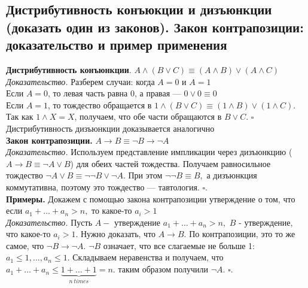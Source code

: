 \documentclass[a4paper]{article}
\newcommand{\qed}{\hfill$\square$}
\begin{document}
\subsection{Дистрибутивность конъюкции и дизъюнкции (доказать один из законов). Закон контрапозиции: доказательство и пример применения}
\label{sec:2.1}\textbf{Дистрибутивность конъюнкции}. $A\wedge(B\vee C)\equiv(A\wedge B)\vee(A\wedge C)$\\[2mm]
\textit{Доказательство.} Разберем случаи: когда $A=0$ и $A=1$\\[2mm]
\indent Если $A=0$, то левая часть равна 0, а правая — $0\vee0\equiv0$\\[2mm]
\indent Если $A=1$, то тождество обращается в $1\wedge(B\vee C)\equiv(1\wedge B)\vee(1\wedge C)$. Так как  $1\wedge X=X$, получаем, что обе части обращаются в $B\vee C$. \qed\\[2mm]
Дистрибутивность дизъюнкции доказывается аналогично\\[2mm]
\textbf{Закон контрапозиции.} $A\rightarrow B\equiv\neg B\rightarrow\neg A$\\[2mm]
\textit{Доказательство.} Используем представление импликации через
дизъюнкцию ($A\rightarrow B\equiv\neg A\vee B$) для обеих частей тождества. Получаем равносильное тождество $\neg A\vee B\equiv\neg\neg B\vee\neg A.$ При этом $\neg\neg B\equiv B,$ а дизъюнкция коммутативна, поэтому это тождество — тавтология. \qed.\\[2mm]
\textbf{Примеры.} Докажем с помощью закона контрапозиции утверждение о том, что если $a_1+\ldots+a_n>n,$ то какое-то $a_i>1$\\[2mm]
\textit{Доказательство.} Пусть $A-$ утверждение $a_1+\ldots+a_n>n,$ $B$ - утверждение, что какое-то $a_i>1$. Нужно доказать, что $A\rightarrow B$. По контрапозиции, это то же самое, что $\neg B\rightarrow\neg A$. $\neg B$ означает, что все слагаемые не больше 1: $a_1\leqslant1,\ldots,a_n\leqslant1.$ Складываем неравенства и получаем, что $a_1+\ldots+a_n\leqslant\underbrace{1+\ldots+1}_{n\ times}=n.$ таким образом получили $\neg A$. \qed.
\end{document}
